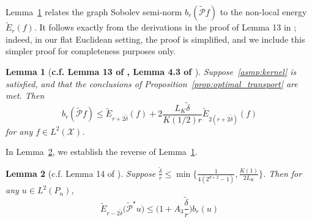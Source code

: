 \documentclass{article}
\newcommand{\1}{\mathbf{1}}
\newcommand{\Xset}{\mathcal{X}}
\newcommand{\Leb}{L}
\newcommand{\mc}[1]{\mathcal{#1}}
\newcommand{\wt}[1]{\widetilde{#1}}
\theoremstyle{alden}
\theoremstyle{aldenthm}
\newtheorem{lemma}{Lemma}
\theoremstyle{definition}
\theoremstyle{remark}
\begin{document}
Lemma~\ref{lem:first_order_graph_sobolev_seminorm_discretized} relates the graph Sobolev semi-norm $b_r(\wt{\mc{P}}f)$ to the non-local energy $\wt{E}_r(f)$. It follows exactly from the derivations in the proof of Lemma 13 in \cite{trillos2019}; indeed, in our flat Euclidean setting, the proof is simplified, and we include this simpler proof for completeness purposes only.
\begin{lemma}[\textbf{c.f. Lemma 13 of \cite{trillos2019}, Lemma 4.3 of \cite{burago2014}}]
	\label{lem:first_order_graph_sobolev_seminorm_discretized}
	Suppose~\ref{asmp:kernel} is satisfied, and that the conclusions of Proposition~\ref{prop:optimal_transport} are met. Then
	\begin{equation*}
	b_r(\wt{\mc{P}}f) \leq \wt{E}_{r + 2\wt{\delta}}(f) + 2\frac{L_K\wt{\delta}}{K(1/2)r} \wt{E}_{2(r + 2\wt{\delta})}(f)
	\end{equation*}
	for any $f \in \Leb^2(\Xset)$.
\end{lemma}

In Lemma~\ref{lem:first_order_graph_sobolev_seminorm_discretized_lb}, we establish the reverse of Lemma~\ref{lem:first_order_graph_sobolev_seminorm_discretized}. 
\begin{lemma}[c.f. Lemma 14 of \cite{trillos2019}]
	\label{lem:first_order_graph_sobolev_seminorm_discretized_lb}
	Suppose $\frac{\wt{\delta}}{r} \leq \min\bigl\{\frac{1}{4(2^{d + 2} - 1)}, \frac{K(1)}{2L_K}\bigr\}$. Then for any $u \in \Leb^2(P_n)$, 
	\begin{equation*}
	\wt{E}_{r - 2\wt{\delta}}\bigl(\wt{\mc{P}}^{\star}u\bigr) \leq \biggl(1 + A_3\frac{\wt{\delta}}{r}\biggr) b_{r}(u)
	\end{equation*}
\end{lemma}
\end{document}
